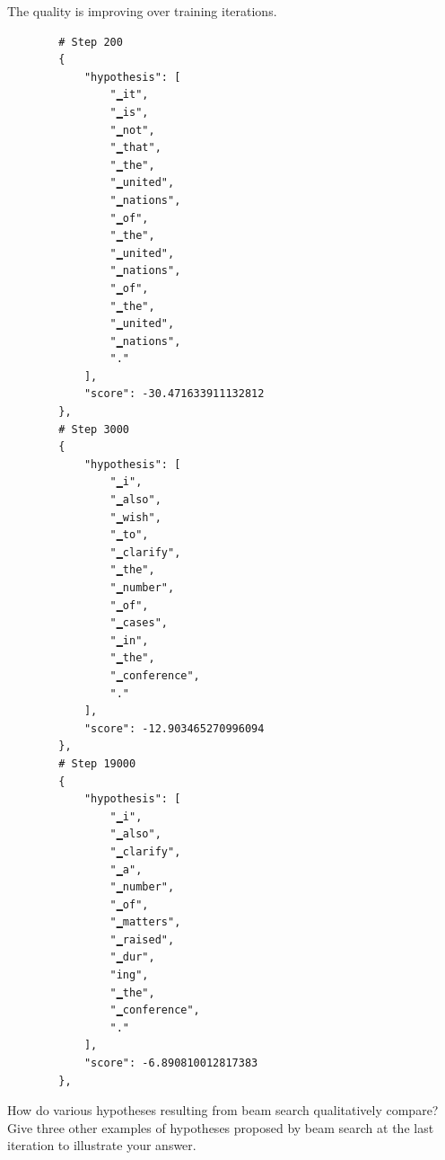 \begin{parts}
\begin{subparts}
        \ifans{} The quality is improving over training iterations.
        \begin{lstlisting}
        # Step 200
        {
            "hypothesis": [
                "▁it",
                "▁is",
                "▁not",
                "▁that",
                "▁the",
                "▁united",
                "▁nations",
                "▁of",
                "▁the",
                "▁united",
                "▁nations",
                "▁of",
                "▁the",
                "▁united",
                "▁nations",
                "."
            ],
            "score": -30.471633911132812
        },
        # Step 3000
        {
            "hypothesis": [
                "▁i",
                "▁also",
                "▁wish",
                "▁to",
                "▁clarify",
                "▁the",
                "▁number",
                "▁of",
                "▁cases",
                "▁in",
                "▁the",
                "▁conference",
                "."
            ],
            "score": -12.903465270996094
        },
        # Step 19000
        {
            "hypothesis": [
                "▁i",
                "▁also",
                "▁clarify",
                "▁a",
                "▁number",
                "▁of",
                "▁matters",
                "▁raised",
                "▁dur",
                "ing",
                "▁the",
                "▁conference",
                "."
            ],
            "score": -6.890810012817383
        },
        \end{lstlisting}
        \subpart[2] How do various hypotheses resulting from beam search qualitatively compare? Give three other examples of hypotheses proposed by beam search at the last iteration to illustrate your answer.
        

\end{subparts}
\end{parts}
